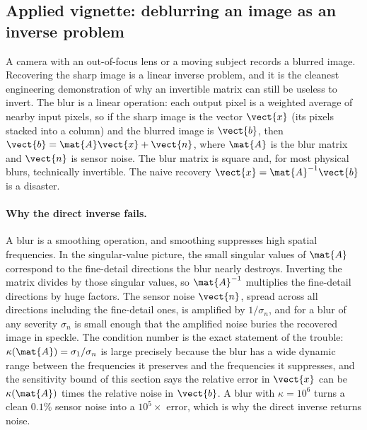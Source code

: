 \subsection{Applied vignette: deblurring an image as an inverse problem}

A camera with an out-of-focus lens or a moving subject records a blurred
image. Recovering the sharp image is a linear inverse problem, and it is
the cleanest engineering demonstration of why an invertible matrix can
still be useless to invert. The blur is a linear operation: each output
pixel is a weighted average of nearby input pixels, so if the sharp
image is the vector $\vect{x}$ (its pixels stacked into a column) and the
blurred image is $\vect{b}$, then $\vect{b} = \mat{A}\vect{x} +
\vect{n}$, where $\mat{A}$ is the blur matrix and $\vect{n}$ is sensor
noise. The blur matrix is square and, for most physical blurs,
technically invertible. The naive recovery $\vect{x} = \mat{A}^{-1}
\vect{b}$ is a disaster.

\paragraph{Why the direct inverse fails.}
A blur is a smoothing operation, and smoothing suppresses high spatial
frequencies. In the singular-value picture, the small singular values of
$\mat{A}$ correspond to the fine-detail directions the blur nearly
destroys. Inverting the matrix divides by those singular values, so
$\mat{A}^{-1}$ multiplies the fine-detail directions by huge factors.
The sensor noise $\vect{n}$, spread across all directions including the
fine-detail ones, is amplified by $1/\sigma_{n}$, and for a blur of any
severity $\sigma_{n}$ is small enough that the amplified noise buries the
recovered image in speckle. The condition number is the exact statement
of the trouble: $\kappa(\mat{A}) = \sigma_{1}/\sigma_{n}$ is large
precisely because the blur has a wide dynamic range between the
frequencies it preserves and the frequencies it suppresses, and the
sensitivity bound of this section says the relative error in $\vect{x}$
can be $\kappa(\mat{A})$ times the relative noise in $\vect{b}$. A blur
with $\kappa = 10^{6}$ turns a clean $0.1\%$ sensor noise into a $10^{5}
\times$ error, which is why the direct inverse returns noise.

